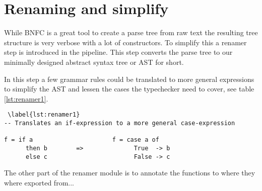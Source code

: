 \section{Renaming and simplify}
While BNFC is a great tool to create a parse tree from raw text the resulting 
tree structure is very verbose with a lot of constructors. To simplify this a
renamer step is introduced in the pipeline. This step converts the parse tree
to our minimally designed abstract syntax tree or AST for short. 

In this step a few grammar rules could be translated to more general expressions
to simplify the AST and lessen the cases the typechecker need to cover, see
table \ref{lst:renamer1}.

\begin{lstlisting} \label{lst:renamer1}
-- Translates an if-expression to a more general case-expression

f = if a                      f = case a of
      then b        =>              True  -> b
      else c                        False -> c
\end{lstlisting}

The other part of the renamer module is to annotate the functions to where they
where exported from...
